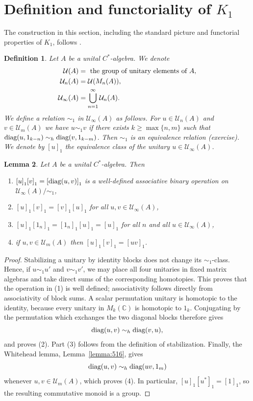 \documentclass{book}
\newtheorem{definition}{Definition}[section]
\newtheorem{lemma}[definition]{Lemma}
\def\cstar{\(C^*\)-algebra}
\def\diag{\textnormal{diag}}
\begin{document}
\section{Definition and functoriality of \texorpdfstring{\(K_1\)}{K1}}
The construction in this section, including the standard picture and functorial properties of \(K_1\),
follows \cite[Sections~8.1--8.2]{RordamLarsenLaustsen2000}.
\begin{definition}
  Let \(A\) be a unital \cstar. We denote
  \begin{align*}
    \mathcal{U}(A)&=\textnormal{ the group of unitary elements of }A,\\
    \mathcal{U}_n(A)&=\mathcal{U}(M_n(A)),\\
    \mathcal{U}_\infty(A)&=\bigcup_{n=1}^{\infty}\mathcal{U}_n(A).
  \end{align*}
  We define a relation \(\sim_1\) in \(\mathcal{U}_\infty(A)\) as follows. For \(u\in\mathcal{U}_n(A)\) and \(v\in\mathcal{U}_m(A)\)
  we have \(u\sim_1 v\) if there exists \(k\geq\max\{n,m\}\) such that \(\textnormal{diag}(u,1_{k-n})\sim_h\textnormal{diag}(v,1_{k-m})\).
  Then \(\sim_1\) is an equivalence relation (exercise). We denote by \({[u]}_1\) the equivalence class of the unitary \(u\in\mathcal{U}_\infty(A)\).
\end{definition}
\begin{lemma}
  Let \(A\) be a unital \cstar. Then
  \begin{enumerate}
    \item \({[u]}_1{[v]}_1={[\textnormal{diag}(u,v)]}_1\) is a well-defined associative binary operation on \(\mathcal{U}_\infty(A)/\sim_1\),
    \item \({[u]}_1{[v]}_1={[v]}_1{[u]}_1\) for all \(u,v\in\mathcal{U}_\infty(A)\),
    \item \({[u]}_1{[1_n]}_1={[1_n]}_1{[u]}_1={[u]}_1\) for all \(n\) and all \(u\in\mathcal{U}_\infty(A)\),
    \item if \(u,v\in\mathcal{U}_m(A)\) then \({[u]}_1{[v]}_1={[uv]}_1\).
  \end{enumerate}
\end{lemma}
\begin{proof}
  Stabilizing a unitary by identity blocks does not change its \(\sim_1\)-class. Hence, if
  \(u\sim_1u'\) and \(v\sim_1v'\), we may place all four unitaries in fixed matrix algebras
  and take direct sums of the corresponding homotopies. This proves that the operation in (1)
  is well defined; associativity follows directly from associativity of block sums.
  A scalar permutation unitary is homotopic to the identity, because every unitary in
  \(M_k(\mathbb{C})\) is homotopic to \(1_k\). Conjugating by the permutation which exchanges
  the two diagonal blocks therefore gives
  \[
    \diag(u,v)\sim_h\diag(v,u),
  \]
  and proves (2). Part (3) follows from the definition of stabilization. Finally, the Whitehead
  lemma, Lemma~\ref{lemma:516}, gives
  \[
    \diag(u,v)\sim_h\diag(uv,1_m)
  \]
  whenever \(u,v\in\mathcal{U}_m(A)\), which proves (4). In particular,
  \({[u]}_1{[u^*]}_1={[1]}_1\), so the resulting commutative monoid is a group.
\end{proof}
\end{document}
